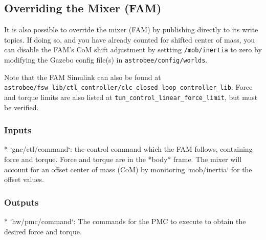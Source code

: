 \documentclass{article}
\begin{document}
\subsection{Overriding the Mixer (FAM)}

It is also possible to override the mixer (FAM) by publishing directly to its write topics. If doing so, and you have already counted for shifted center of mass, you can disable the FAM's CoM shift adjustment by settting \texttt{/mob/inertia} 
to zero by modifying the Gazebo config file(s) in \texttt{astrobee/config/worlds}.

Note that the FAM Simulink can also be found at\\
\texttt{astrobee/fsw\_lib/ctl\_controller/clc\_closed\_loop\_controller\_lib}. Force and torque limits are also listed at \texttt{tun\_control\_linear\_force\_limit}, but must be verified.

\subsubsection{Inputs}
\begin{markdown}
* `gnc/ctl/command`: the control command which the FAM follows, containing force and torque. Force and torque are in the *body* frame. The mixer will account for an offset center of mass (CoM) by monitoring `mob/inertia` for the offset values.
\end{markdown}

\subsubsection{Outputs}
\begin{markdown}
* `hw/pmc/command`: The commands for the PMC to execute to obtain the desired force and torque.
\end{markdown}
\end{document}
